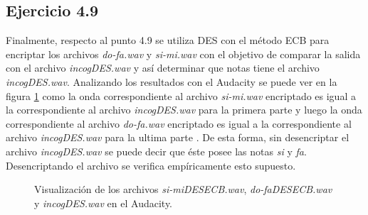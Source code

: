 \documentclass[a4paper,10pt]{article}
\begin{document}
\subsection{Ejercicio 4.9}
Finalmente, respecto al punto 4.9 se utiliza DES con el m\'etodo ECB para encriptar
los archivos \emph{do-fa.wav} y \emph{si-mi.wav} con el objetivo de comparar la salida
con el archivo \emph{incogDES.wav} y as\'i determinar que notas tiene el archivo
\emph{incogDES.wav}. Analizando los resultados con el Audacity se puede ver en la figura
\ref{fig:DESAudacityCmp} como la onda correspondiente al archivo \emph{si-mi.wav} encriptado
es igual a la correspondiente al archivo \emph{incogDES.wav} para la primera parte y luego 
la onda correspondiente al archivo \emph{do-fa.wav} encriptado
es igual a la correspondiente al archivo \emph{incogDES.wav} para la ultima parte . De esta forma,
sin desencriptar
el archivo \emph{incogDES.wav} se puede decir que \'este posee las notas \emph{si} y \emph{fa}.
Desencriptando el archivo se verifica empíricamente esto supuesto.
\begin{figure}
	\begin{center}
	\end{center}
	\caption{Visualización de los archivos \emph{si-miDESECB.wav}, \emph{do-faDESECB.wav} y
		\emph{incogDES.wav} en el Audacity.}
	\label{fig:DESAudacityCmp}
\end{figure}
\end{document}
